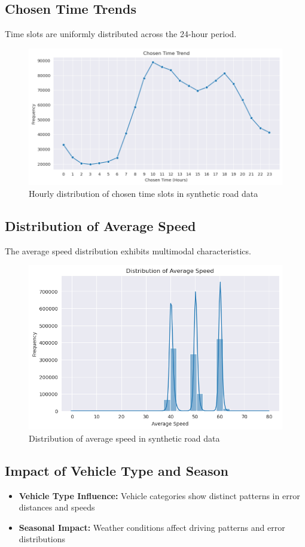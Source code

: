 \documentclass[sigplan,screen]{acmart}
\begin{document}
\subsection{Chosen Time Trends}
Time slots are uniformly distributed across the 24-hour period.

\begin{figure}[h]
    \centering
    \includegraphics[width=0.8\linewidth]{images/time_dist.png}
    \caption{Hourly distribution of chosen time slots in synthetic road data}
    \label{fig:time_trend}
\end{figure}

\subsection{Distribution of Average Speed}
The average speed distribution exhibits multimodal characteristics.

\begin{figure}[h]
    \centering
    \includegraphics[width=0.8\linewidth]{images/speed_dist.png}
    \caption{Distribution of average speed in synthetic road data}
    \label{fig:speed_dist}
\end{figure}

\subsection{Impact of Vehicle Type and Season}
\begin{itemize}
    \item \textbf{Vehicle Type Influence:} Vehicle categories show distinct patterns in error distances and speeds
    \item \textbf{Seasonal Impact:} Weather conditions affect driving patterns and error distributions
\end{itemize}
\end{document}
